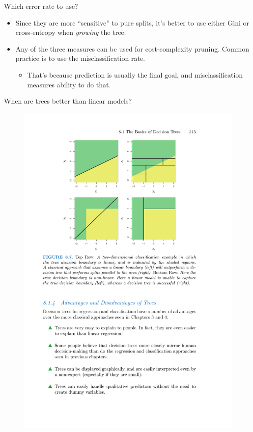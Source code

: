 \documentclass[mathserif, aspectratio=169]{beamer}
\begin{document}
\begin{frame}{Which error rate to use?}

\begin{itemize}
\item Since they are more ``sensitive'' to pure splits, it's better to use either Gini or cross-entropy when \textit{growing} the tree. 
\item Any of the three measures can be used for cost-complexity pruning.  Common practice is to use the misclassification rate.
\begin{itemize}
\item That's because prediction is usually the final goal, and misclassification measures ability to do that.
\end{itemize}
\end{itemize}
\end{frame}


\begin{frame}{When are trees better than linear models?}
\begin{figure}
\includegraphics[height=0.9\textheight]{tree_vs_linear_for_classification}
\caption*{}
\end{figure}
\end{frame}
\end{document}
